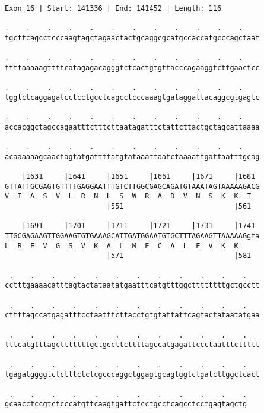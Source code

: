 \documentclass{article}
\begin{document}
\begin{Verbatim}
Exon 16 | Start: 141336 | End: 141452 | Length: 116
 
.    .    .    .    .    .    .    .    .    .    .    .    
tgcttcagcctcccaagtagctagaactactgcaggcgcatgccaccatgcccagctaat
  
.    .    .    .    .    .    .    .    .    .    .    .    
ttttaaaaagttttcatagagacagggtctcactgtgttacccagaaggtcttgaactcc
  
.    .    .    .    .    .    .    .    .    .    .    .    
tggtctcaggagatcctcctgcctcagcctcccaaagtgataggattacaggcgtgagtc
  
.    .    .    .    .    .    .    .    .    .    .    .    
accacggctagccagaatttctttcttaatagatttctattcttactgctagcattaaaa
  
.    .    .    .    .    .    .    .    .    .    .    .    
acaaaaaagcaactagtatgattttatgtataaattaatctaaaattgattaatttgcag
  
    |1631     |1641     |1651     |1661     |1671     |1681 
GTTATTGCGAGTGTTTTGAGGAATTTGTCTTGGCGAGCAGATGTAAATAGTAAAAAGACG
V  I  A  S  V  L  R  N  L  S  W  R  A  D  V  N  S  K  K  T  
                        |551                          |561  
  
    |1691     |1701     |1711     |1721     |1731     |1741 
TTGCGAGAAGTTGGAAGTGTGAAAGCATTGATGGAATGTGCTTTAGAAGTTAAAAAGgta
L  R  E  V  G  S  V  K  A  L  M  E  C  A  L  E  V  K  K     
                        |571                          |581  
  
 .    .    .    .    .    .    .    .    .    .    .    .   
cctttgaaaacatttagtactataatatgaatttcatgtttggcttttttttgctgcctt
  
 .    .    .    .    .    .    .    .    .    .    .    .   
cttttagccatgagatttcctaatttcttacctgtgtattattcagtactataatatgaa
  
 .    .    .    .    .    .    .    .    .    .    .    .   
tttcatgtttagctttttttgctgccttcttttagccatgagattccctaatttcttttt
  
 .    .    .    .    .    .    .    .    .    .    .    .   
tgagatggggtctctttctctcgcccaggctggagtgcagtggtctgatcttggctcact
  
 .    .    .    .    .    .    .    .    .    .    .    .
gcaacctccgtctcccatgttcaagtgattctcctgcctcagcctcctgagtagctg
\end{Verbatim}
\newpage
\end{document}
